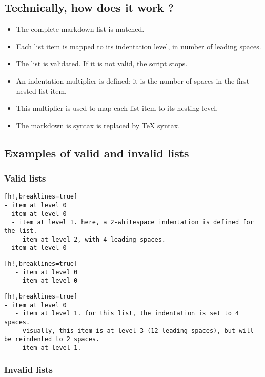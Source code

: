 \documentclass[a4paper, 12pt, twoside]{book}
\begin{document}
\subsection*{Technically, how does it work ?}

\begin{itemize}
\item The complete markdown list is matched.
\item Each list item is mapped to its indentation level, in number of leading spaces.
\item The list is validated. If it is not valid, the script stops.
\item An indentation multiplier is defined: it is the number of spaces in the first nested list item.
\item This multiplier is used to map each list item to its nesting level.
\item The markdown is syntax is replaced by TeX syntax. 
\end{itemize}
\subsection*{Examples of valid and invalid lists}
\subsubsection*{Valid lists}

\begin{Verbatim}[h!,breaklines=true]
- item at level 0
- item at level 0
  - item at level 1. here, a 2-whitespace indentation is defined for the list.
   - item at level 2, with 4 leading spaces.
- item at level 0
\end{Verbatim}

\begin{Verbatim}[h!,breaklines=true]
   - item at level 0
   - item at level 0
\end{Verbatim}

\begin{Verbatim}[h!,breaklines=true]
- item at level 0
   - item at level 1. for this list, the indentation is set to 4 spaces.
   - visually, this item is at level 3 (12 leading spaces), but will be reindented to 2 spaces.
   - item at level 1.
\end{Verbatim}
\subsubsection*{Invalid lists}
\end{document}

